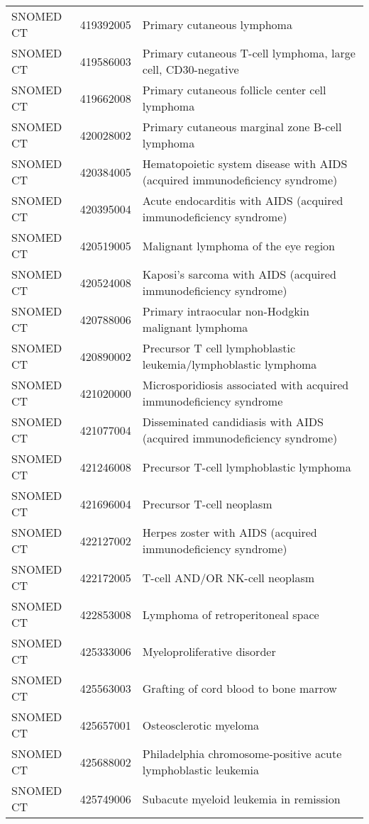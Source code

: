 \begin{longtable}{p{}p{}p{}}
  SNOMED CT & 419392005 & Primary cutaneous lymphoma \\ 
  SNOMED CT & 419586003 & Primary cutaneous T-cell lymphoma, large cell, CD30-negative \\ 
  SNOMED CT & 419662008 & Primary cutaneous follicle center cell lymphoma \\ 
  SNOMED CT & 420028002 & Primary cutaneous marginal zone B-cell lymphoma \\ 
  SNOMED CT & 420384005 & Hematopoietic system disease with AIDS (acquired immunodeficiency syndrome) \\ 
  SNOMED CT & 420395004 & Acute endocarditis with AIDS (acquired immunodeficiency syndrome) \\ 
  SNOMED CT & 420519005 & Malignant lymphoma of the eye region \\ 
  SNOMED CT & 420524008 & Kaposi's sarcoma with AIDS (acquired immunodeficiency syndrome) \\ 
  SNOMED CT & 420788006 & Primary intraocular non-Hodgkin malignant lymphoma \\ 
  SNOMED CT & 420890002 & Precursor T cell lymphoblastic leukemia/lymphoblastic lymphoma \\ 
  SNOMED CT & 421020000 & Microsporidiosis associated with acquired immunodeficiency syndrome \\ 
  SNOMED CT & 421077004 & Disseminated candidiasis with AIDS (acquired immunodeficiency syndrome) \\ 
  SNOMED CT & 421246008 & Precursor T-cell lymphoblastic lymphoma \\ 
  SNOMED CT & 421696004 & Precursor T-cell neoplasm \\ 
  SNOMED CT & 422127002 & Herpes zoster with AIDS (acquired immunodeficiency syndrome) \\ 
  SNOMED CT & 422172005 & T-cell AND/OR NK-cell neoplasm \\ 
  SNOMED CT & 422853008 & Lymphoma of retroperitoneal space \\ 
  SNOMED CT & 425333006 & Myeloproliferative disorder \\ 
  SNOMED CT & 425563003 & Grafting of cord blood to bone marrow \\ 
  SNOMED CT & 425657001 & Osteosclerotic myeloma \\ 
  SNOMED CT & 425688002 & Philadelphia chromosome-positive acute lymphoblastic leukemia \\ 
  SNOMED CT & 425749006 & Subacute myeloid leukemia in remission \\ 

\end{longtable}

